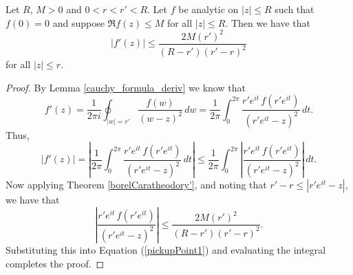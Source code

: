 \begin{lemma}[DerivativeBound]
\label{DerivativeBound}
\leanok
Let $R,\,M>0$ and $0 < r < r' < R$. Let $f$ be analytic on $|z|\leq R$ such that
    $f(0)=0$ and suppose $\Re f(z)\leq M$ for all $|z|\leq R$. Then we have that
    $$|f'(z)|\leq\frac{2M(r')^2}{(R-r')(r'-r)^2}$$
    for all $|z|\leq r$.
\end{lemma}
\begin{proof}
\leanok
By Lemma \ref{cauchy_formula_deriv} we know that
    $$f'(z)=\frac{1}{2\pi i}\oint_{|w|=r'}\frac{f(w)}{(w-z)^2}\,dw
      =\frac{1}{2\pi }\int_0^{2\pi}\frac{r'e^{it}\,f(r'e^{it})}{(r'e^{it}-z)^2}\,dt.$$
    Thus,
    \begin{equation}\label{pickupPoint1}
        |f'(z)|=\left|\frac{1}{2\pi}\int_0^{2\pi}
          \frac{r'e^{it}\,f(r'e^{it})}{(r'e^{it}-z)^2}\,dt\right|
          \leq\frac{1}{2\pi}\int_0^{2\pi}
          \left|\frac{r'e^{it}\,f(r'e^{it})}{(r'e^{it}-z)^2}\right|\,dt.
    \end{equation}
    Now applying Theorem \ref{borelCaratheodory'}, and noting that
    $r'-r\leq|r'e^{it}-z|$, we have that
    $$\left|\frac{r'e^{it}\,f(r'e^{it})}{(r'e^{it}-z)^2}\right|
      \leq\frac{2M(r')^2}{(R-r')(r'-r)^2}.$$
    Substituting this into Equation (\ref{pickupPoint1}) and evaluating the integral
    completes the proof.
\end{proof}
